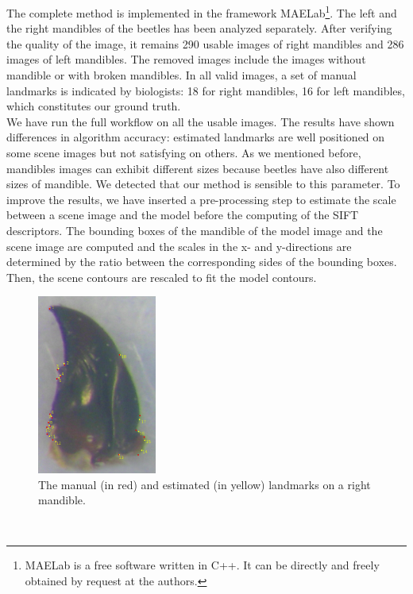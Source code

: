 \documentclass[twoside,twocolumn,10pt]{article}
\begin{document}
The complete method is implemented in the framework MAELab\footnote{MAELab
  is a free software written in C++. It can be directly and freely obtained by request
  at the authors.}. The left and the right mandibles of the beetles has been analyzed separately.
After verifying the quality of the image, it remains 290 usable images of right mandibles and 286 images of left mandibles.
The removed images include the images without mandible or with broken mandibles.
In all valid images, a set of manual landmarks is indicated by
biologists: 18 for right mandibles, 16 for left mandibles, which
constitutes our ground truth.
\\
We have run the full workflow on all the usable images.
The results have shown differences in algorithm accuracy: estimated
landmarks are well positioned on some scene images but not satisfying
on others. As we mentioned before, mandibles images can exhibit
different sizes because beetles have also different sizes of
mandible. We detected that our method is sensible to this parameter. 
To improve the results, we have inserted a pre-processing step to
estimate the scale between a scene image and the model before the
computing of the SIFT descriptors. The bounding boxes of the mandible
of the model image and the scene image are computed and the scales in the x-
and y-directions are determined by the ratio between the corresponding
sides of the bounding boxes. Then, the scene contours are rescaled to fit the model contours. \\
\begin{figure}[h]
\centering
\includegraphics[width=0.35\textwidth]{./images/md_rs}
\caption{The manual (in red) and estimated (in yellow) landmarks on a right mandible.}
\label{figresult}
\end{figure}~\\
\end{document}
